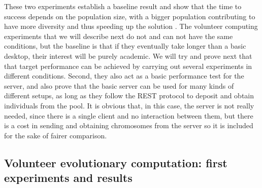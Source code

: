 \documentclass[journal,onecolumn]{IEEEtran}
\begin{document}
These two experiments establish a baseline result and show that
the time to success depends on the population size, with a bigger population
contributing to have more diversity and thus speeding up the solution \cite{DBLP:conf/lion/LaredoDFGB13}. The volunteer computing
experiments that we will describe next do not and can not have the
same conditions, but
the baseline is that if they eventually take longer than a basic
desktop, their interest will be purely academic. We will try and
prove next that that target performance can be achieved by carrying
out several experiments in different conditions. Second, they also act
as a basic performance test for the server, and also prove that the
basic server can be used for many kinds of different setups, as long
as they follow the REST protocol to deposit and obtain individuals
from the pool. It is obvious that, in this case, the server is not
really needed, since there is a single client and no interaction
between them, but there is a cost in sending and obtaining chromosomes
from the server so it is included for the sake of fairer comparison.

\subsection{Volunteer evolutionary computation: first experiments and results}
\end{document}
